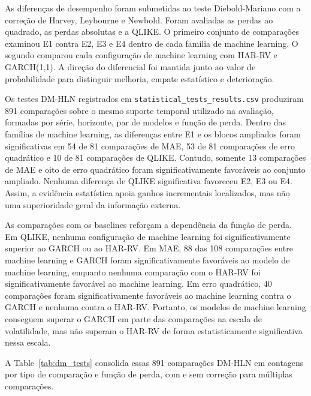 \documentclass[a4paper,fleqn]{cas-sc}
\begin{document}
As diferenças de desempenho foram submetidas ao teste Diebold-Mariano com a correção de Harvey, Leybourne e Newbold. Foram avaliadas as perdas ao quadrado, as perdas absolutas e a QLIKE. O primeiro conjunto de comparações examinou E1 contra E2, E3 e E4 dentro de cada família de machine learning. O segundo comparou cada configuração de machine learning com HAR-RV e GARCH(1,1). A direção do diferencial foi mantida junto ao valor de probabilidade para distinguir melhoria, empate estatístico e deterioração.

Os testes DM-HLN registrados em \texttt{statistical\_tests\_results.csv} produziram 891 comparações sobre o mesmo suporte temporal utilizado na avaliação, formadas por série, horizonte, par de modelos e função de perda. Dentro das famílias de machine learning, as diferenças entre E1 e os blocos ampliados foram significativas em 54 de 81 comparações de MAE, 53 de 81 comparações de erro quadrático e 10 de 81 comparações de QLIKE. Contudo, somente 13 comparações de MAE e oito de erro quadrático foram significativamente favoráveis ao conjunto ampliado. Nenhuma diferença de QLIKE significativa favoreceu E2, E3 ou E4. Assim, a evidência estatística apoia ganhos incrementais localizados, mas não uma superioridade geral da informação externa.

As comparações com os baselines reforçam a dependência da função de perda. Em QLIKE, nenhuma configuração de machine learning foi significativamente superior ao GARCH ou ao HAR-RV. Em MAE, 88 das 108 comparações entre machine learning e GARCH foram significativamente favoráveis ao modelo de machine learning, enquanto nenhuma comparação com o HAR-RV foi significativamente favorável ao machine learning. Em erro quadrático, 40 comparações foram significativamente favoráveis ao machine learning contra o GARCH e nenhuma contra o HAR-RV. Portanto, os modelos de machine learning conseguem superar o GARCH em parte das comparações na escala de volatilidade, mas não superam o HAR-RV de forma estatisticamente significativa nessa escala.

A Table~\ref{tab:dm_tests} consolida essas 891 comparações DM-HLN em contagens por tipo de comparação e função de perda, com e sem correção para múltiplas comparações.
\end{document}
